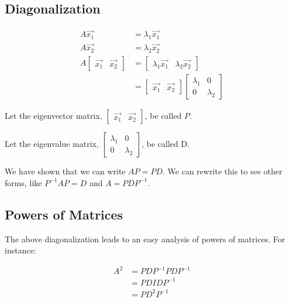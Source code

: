 \documentclass[12pt,landscape,a4paper]{article}
\begin{document}
\begin{multicols*}{3}
  \section{Diagonalization}
  \begin{align*}
    A \vec{x_1} &= \lambda_1 \vec{x_1} \\
    A \vec{x_2} &= \lambda_2 \vec{x_2} \\
    A \begin{bmatrix} \vec{x_1} & \vec{x_2} \end{bmatrix} &= \begin{bmatrix}
  \lambda_1 \vec{x_1} & \lambda_2 \vec{x_2} \end{bmatrix}\\
                        &= \begin{bmatrix} \vec{x_1} & \vec{x_2} \end{bmatrix}
                        \begin{bmatrix} \lambda_1 & 0 \\ 0 & \lambda_2 \end{bmatrix}
  \end{align*}

                        Let the eigenvector matrix, $\begin{bmatrix} \vec{x_1} &
                        \vec{x_2} \end{bmatrix}$, be called $P$.

                        Let the eigenvalue matrix, $\begin{bmatrix} \lambda_1 &
                        0 \\ 0 & \lambda_2 \end{bmatrix}$, be called D.

                        We have shown that we can write $AP = PD$. We can
                        rewrite this to see other forms, like $P^{-1} A P = D$
                        and $A = PDP^{-1}$.
  \subsection{Powers of Matrices}
  The above diagonalization leads to an easy analysis of powers of matrices. For
  instance:

  \begin{align*}
    A^2 &= PDP^{-1}PDP^{-1} \\
        &= PDIDP^{-1} \\
        &= PD^2P^{-1}
  \end{align*}


\end{multicols*}
\end{document}
